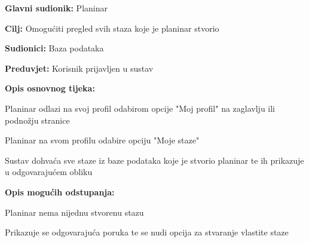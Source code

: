 			\noindent {}
		\begin{packed_item}
			
			\item \textbf{Glavni sudionik: }$ $Planinar$ $
			\item  \textbf{Cilj:} $ $Omogućiti pregled svih staza koje je planinar stvorio$ $
			\item  \textbf{Sudionici:} $ $Baza podataka$ $
			\item  \textbf{Preduvjet:} $ $Korisnik prijavljen u sustav$ $
			\item  \textbf{Opis osnovnog tijeka:}
			
			\item[] \begin{packed_enum}
				\item $ $Planinar odlazi na svoj profil odabirom opcije "Moj profil" na zaglavlju ili podnožju stranice$ $
				\item $ $Planinar na svom profilu odabire opciju "Moje staze"$ $
				\item $ $Sustav dohvaća sve staze iz baze podataka koje je stvorio planinar te ih prikazuje u odgovarajućem obliku$ $
			\end{packed_enum}
		\item  \textbf{Opis mogućih odstupanja:}
			\item[] \begin{packed_item}
				
				\item[3.a] $ $Planinar nema nijednu stvorenu stazu$ $
				\item[] \begin{packed_enum}
					\item $ $Prikazuje se odgovarajuća poruka te se nudi opcija za stvaranje vlastite staze$ $
				\end{packed_enum}
			\end{packed_item}
		\end{packed_item}
	
